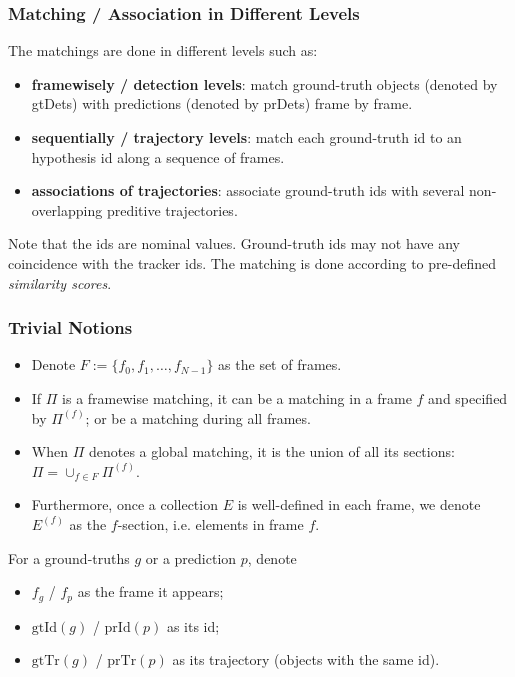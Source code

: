 \documentclass[slidetop, mathserif]{beamer}
\begin{document}
\begin{frame}
	\frametitle{Matching / Association in Different Levels}
			
		
	\vspace{4pt}
			
	The matchings are done in different levels such as:
	\begin{itemize}
		\item {\bf framewisely / detection levels}:
		      match ground-truth objects (denoted by gtDets)
		      with predictions (denoted by prDets) frame by frame.
		\item {\bf sequentially / trajectory levels}:
		      match each ground-truth id to an hypothesis id along a sequence of frames.
		\item {\bf associations of trajectories}:
		      associate ground-truth ids with several non-overlapping preditive trajectories.
	\end{itemize}
		

	Note that the ids are nominal values. Ground-truth ids may not have any coincidence
	with the tracker ids.
	The matching is done according to pre-defined \emph{similarity scores}.
			
\end{frame}

\begin{frame}
	\frametitle{Trivial Notions}
			
	\begin{itemize}
		\item Denote $F:=\{f_0, f_1, \ldots, f_{N-1}\}$ as the set of frames.
		\item If $\Pi$ is a framewise matching, it can be a matching in a frame $f$ and specified by $\Pi^{(f)}$;
		      or be a matching during all frames.
		\item When $\Pi$ denotes a global matching, it is the union of all its sections:
		      $\Pi = \cup_{f\in F}\Pi^{(f)}$.
		\item Furthermore, once a collection $E$ is well-defined in each frame,
		      we denote $E^{(f)}$ as the $f$-section, i.e. elements in frame $f$.
		      		      		      
	\end{itemize}
			
	For a ground-truths $g$ or a prediction $p$, denote
	\begin{itemize}
		\item $f_g$ / $f_p$ as the frame it appears;
		\item $\text{gtId}(g)$ / $\text{prId}(p)$ as its id;
		\item $\text{gtTr}(g)$ / $\text{prTr}(p)$ as its trajectory (objects with the same id).
	\end{itemize}
\end{frame}
\end{document}
